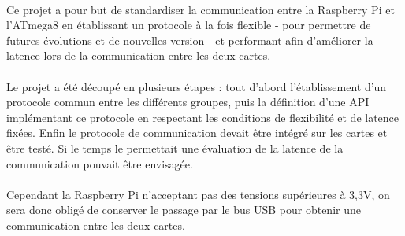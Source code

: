 \paragraph{}
Ce projet a pour but de standardiser la communication entre la Raspberry Pi et
l'ATmega8 en établissant un protocole à la fois flexible - pour permettre de
futures évolutions et de nouvelles version - et performant afin d'améliorer la
latence lors de la communication entre les deux cartes.

\paragraph{}
Le projet a été découpé en plusieurs étapes : tout d'abord l'établissement
d'un protocole commun entre les différents groupes, puis la définition d'une
API implémentant ce protocole en respectant les conditions de flexibilité et
de latence fixées. Enfin le protocole de communication devait être intégré sur
les cartes et être testé. Si le temps le permettait une évaluation de la
latence de la communication pouvait être envisagée.

\paragraph{}
Cependant la Raspberry Pi n'acceptant pas des tensions supérieures à 3,3V, on
sera donc obligé de conserver le passage par le bus USB pour obtenir une
communication entre les deux cartes.
